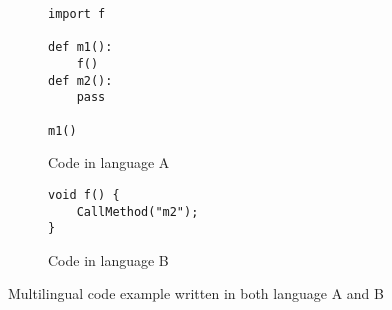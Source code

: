\begin{figure}[t]
  \centering
  \vspace{2mm}
  \begin{subfigure}[t]{0.5\textwidth}
    \begin{lstlisting}[style=mpython]
import f

def m1():
    f()
def m2():
    pass

m1()
    \end{lstlisting}
    \vspace*{-.5em}
    \caption{Code in language A}
    \label{fig:exam:langA}
  \end{subfigure}
  \begin{subfigure}[t]{0.5\textwidth}
    \begin{lstlisting}[style=mcpp,firstnumber=9]
void f() {
    CallMethod("m2");
}
    \end{lstlisting}
    \vspace*{-.5em}
    \caption{Code in language B}
    \label{fig:exam:langB}
  \end{subfigure}
  \vspace*{-.5em}
  \caption{Multilingual code example written in both language A and B}
  \label{fig:exam}
\end{figure}

%

